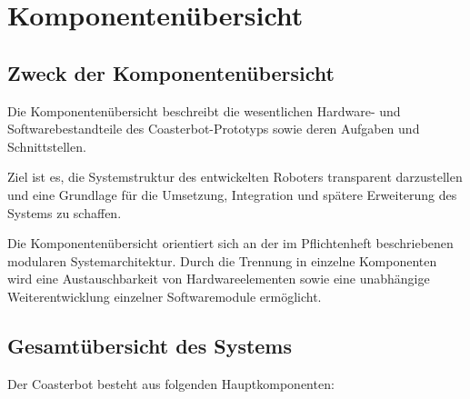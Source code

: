 \section{Komponentenübersicht}\label{komponentenuxfcbersicht}

\subsection{Zweck der
Komponentenübersicht}\label{zweck-der-komponentenuxfcbersicht}

Die Komponentenübersicht beschreibt die wesentlichen Hardware- und
Softwarebestandteile des Coasterbot-Prototyps sowie deren Aufgaben und
Schnittstellen.

Ziel ist es, die Systemstruktur des entwickelten Roboters transparent
darzustellen und eine Grundlage für die Umsetzung, Integration und
spätere Erweiterung des Systems zu schaffen.

Die Komponentenübersicht orientiert sich an der im Pflichtenheft
beschriebenen modularen Systemarchitektur. Durch die Trennung in
einzelne Komponenten wird eine Austauschbarkeit von Hardwareelementen
sowie eine unabhängige Weiterentwicklung einzelner Softwaremodule
ermöglicht.

\subsection{Gesamtübersicht des
Systems}\label{gesamtuxfcbersicht-des-systems}

Der Coasterbot besteht aus folgenden Hauptkomponenten:

